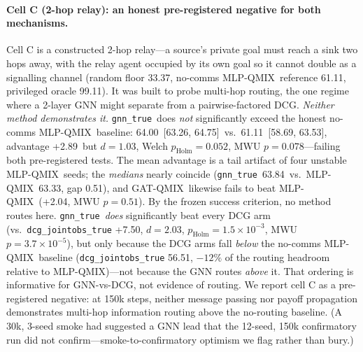 \documentclass[10pt]{article}
\newcommand{\algoname}[1]{\textsc{#1}}
\newcommand{\mlpqmix}{\algoname{MLP-QMIX}}
\newcommand{\gatqmix}{\algoname{GAT-QMIX}}
\newcommand{\gtrue}{\texttt{gnn\_true}}
\newcommand{\CBCfloor}{33.37}
\newcommand{\CBCoracle}{99.11}
\newcommand{\CBCgnn}{64.00}            %
\newcommand{\CBCgnnMed}{63.84}
\newcommand{\CBCgnnCI}{[63.26, 64.75]}
\newcommand{\CBCmlp}{61.11}            %
\newcommand{\CBCmlpMed}{63.33}
\newcommand{\CBCmlpCI}{[58.69, 63.53]}
\newcommand{\CBCdcgtrue}{56.51}        %
\newcommand{\CBCgnnMlpGap}{+2.89}      %
\newcommand{\CBCgatMlpGap}{+2.04}      %
\newcommand{\CBCgnnDcgGap}{+7.50}      %
\newcommand{\CBCmedGap}{0.51}          %
\begin{document}
\paragraph{Cell C (2-hop relay): an honest pre-registered negative for both
mechanisms.} Cell C is a constructed 2-hop relay---a source's private goal must
reach a sink two hops away, with the relay agent occupied by its own goal so it
cannot double as a signalling channel (random floor \CBCfloor, no-comms
\mlpqmix\ reference \CBCmlp, privileged oracle \CBCoracle). It was built to
probe multi-hop routing, the one regime where a 2-layer GNN might separate from
a pairwise-factored DCG. \emph{Neither method demonstrates it.} \gtrue\ does
\emph{not} significantly exceed the honest no-comms \mlpqmix\ baseline: \CBCgnn\
\CBCgnnCI\ vs.\ \CBCmlp\ \CBCmlpCI, advantage \CBCgnnMlpGap\ but $d{=}1.03$,
Welch $p_{\text{Holm}}{=}0.052$, MWU $p{=}0.078$---failing both pre-registered
tests. The mean advantage is a tail artifact of four unstable \mlpqmix\ seeds;
the \emph{medians} nearly coincide (\gtrue\ \CBCgnnMed\ vs.\ \mlpqmix\
\CBCmlpMed, gap \CBCmedGap), and \gatqmix\ likewise fails to beat \mlpqmix\
(\CBCgatMlpGap, MWU $p{=}0.51$). By the frozen success criterion, no method
routes here. \gtrue\ \emph{does} significantly beat every DCG arm (vs.\
\texttt{dcg\_jointobs\_true} \CBCgnnDcgGap, $d{=}2.03$,
$p_{\text{Holm}}{=}1.5{\times}10^{-3}$, MWU $p{=}3.7{\times}10^{-5}$), but only
because the DCG arms fall \emph{below} the no-comms \mlpqmix\ baseline
(\texttt{dcg\_jointobs\_true} \CBCdcgtrue, ${-}12\%$ of the routing headroom
relative to \mlpqmix)---not because the GNN routes \emph{above} it. That
ordering is informative for GNN-vs-DCG, not evidence of routing. We report cell
C as a pre-registered negative: at 150k steps, neither message passing nor
payoff propagation demonstrates multi-hop information routing above the
no-routing baseline. (A 30k, 3-seed smoke had suggested a GNN lead that the
12-seed, 150k confirmatory run did not confirm---smoke-to-confirmatory optimism
we flag rather than bury.)
\end{document}
